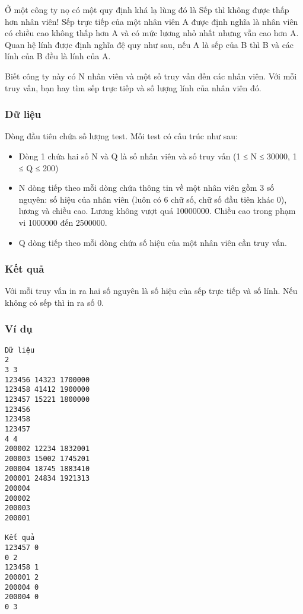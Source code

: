 



   Ở một công ty nọ có một quy định khá lạ lùng đó là Sếp thì không được thấp hơn nhân viên! Sếp trực tiếp của một nhân viên A được định nghĩa là nhân viên có chiều cao không thấp hơn A và có mức lương nhỏ nhất nhưng vẫn cao hơn A. Quan hệ lính được định nghĩa đệ quy như sau, nếu A là sếp của B thì B và các lính của B đều là lính của A.  

   Biết công ty này có N nhân viên và một số truy vấn đến các nhân viên. Với mỗi truy vấn, bạn hay tìm sếp trực tiếp và số lượng lính của nhân viên đó.  

\subsubsection{   Dữ liệu  }

   Dòng đầu tiên chứa số lượng test. Mỗi test có cấu trúc như sau:  
\begin{itemize}
	\item     Dòng 1 chứa hai số N và Q là số nhân viên và số truy vấn (1 ≤ N ≤ 30000, 1 ≤ Q ≤ 200)   
	\item     N dòng tiếp theo mỗi dòng chứa thông tin về một nhân viên gồm 3 số nguyên: số hiệu của nhân viên (luôn có 6 chữ số, chữ số đầu tiên khác 0), lương và chiều cao. Lương không vượt quá 10000000. Chiều cao trong phạm vi 1000000 đến 2500000.   
	\item     Q dòng tiếp theo mỗi dòng chứa số hiệu của một nhân viên cần truy vấn.   
\end{itemize}

\subsubsection{   Kết quả  }

   Với mỗi truy vấn in ra hai số nguyên là số hiệu của sếp trực tiếp và số lính. Nếu không có sếp thì in ra số 0.  

\subsubsection{   Ví dụ  }
\begin{verbatim}
Dữ liệu
2
3 3
123456 14323 1700000
123458 41412 1900000
123457 15221 1800000
123456
123458
123457
4 4
200002 12234 1832001
200003 15002 1745201
200004 18745 1883410
200001 24834 1921313
200004
200002
200003
200001

Kết quả
123457 0
0 2
123458 1
200001 2
200004 0
200004 0
0 3
\end{verbatim}